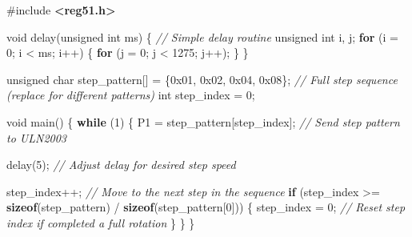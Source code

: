\documentclass[
]{article}
\newenvironment{Shaded}{}{}
\newcommand{\BaseNTok}[1]{\textcolor[rgb]{0.25,0.63,0.44}{#1}}
\newcommand{\CommentTok}[1]{\textcolor[rgb]{0.38,0.63,0.69}{\textit{#1}}}
\newcommand{\ControlFlowTok}[1]{\textcolor[rgb]{0.00,0.44,0.13}{\textbf{#1}}}
\newcommand{\DataTypeTok}[1]{\textcolor[rgb]{0.56,0.13,0.00}{#1}}
\newcommand{\DecValTok}[1]{\textcolor[rgb]{0.25,0.63,0.44}{#1}}
\newcommand{\ImportTok}[1]{\textcolor[rgb]{0.00,0.50,0.00}{\textbf{#1}}}
\newcommand{\KeywordTok}[1]{\textcolor[rgb]{0.00,0.44,0.13}{\textbf{#1}}}
\newcommand{\NormalTok}[1]{#1}
\newcommand{\OperatorTok}[1]{\textcolor[rgb]{0.40,0.40,0.40}{#1}}
\newcommand{\PreprocessorTok}[1]{\textcolor[rgb]{0.74,0.48,0.00}{#1}}
\begin{document}
\begin{Shaded}
\begin{Highlighting}[]
\PreprocessorTok{\#include }\ImportTok{\textless{}reg51.h\textgreater{}}

\DataTypeTok{void}\NormalTok{ delay}\OperatorTok{(}\DataTypeTok{unsigned} \DataTypeTok{int}\NormalTok{ ms}\OperatorTok{)} \OperatorTok{\{} \CommentTok{// Simple delay routine}
    \DataTypeTok{unsigned} \DataTypeTok{int}\NormalTok{ i}\OperatorTok{,}\NormalTok{ j}\OperatorTok{;}
    \ControlFlowTok{for} \OperatorTok{(}\NormalTok{i }\OperatorTok{=} \DecValTok{0}\OperatorTok{;}\NormalTok{ i }\OperatorTok{\textless{}}\NormalTok{ ms}\OperatorTok{;}\NormalTok{ i}\OperatorTok{++)} \OperatorTok{\{}
        \ControlFlowTok{for} \OperatorTok{(}\NormalTok{j }\OperatorTok{=} \DecValTok{0}\OperatorTok{;}\NormalTok{ j }\OperatorTok{\textless{}} \DecValTok{1275}\OperatorTok{;}\NormalTok{ j}\OperatorTok{++);}
    \OperatorTok{\}}
\OperatorTok{\}}

\DataTypeTok{unsigned} \DataTypeTok{char}\NormalTok{ step\_pattern}\OperatorTok{[]} \OperatorTok{=} \OperatorTok{\{}\BaseNTok{0x01}\OperatorTok{,} \BaseNTok{0x02}\OperatorTok{,} \BaseNTok{0x04}\OperatorTok{,} \BaseNTok{0x08}\OperatorTok{\};} \CommentTok{// Full step sequence (replace for different patterns)}
\DataTypeTok{int}\NormalTok{ step\_index }\OperatorTok{=} \DecValTok{0}\OperatorTok{;}

\DataTypeTok{void}\NormalTok{ main}\OperatorTok{()} \OperatorTok{\{}
    \ControlFlowTok{while} \OperatorTok{(}\DecValTok{1}\OperatorTok{)} \OperatorTok{\{}
\NormalTok{        P1 }\OperatorTok{=}\NormalTok{ step\_pattern}\OperatorTok{[}\NormalTok{step\_index}\OperatorTok{];} \CommentTok{// Send step pattern to ULN2003}

\NormalTok{        delay}\OperatorTok{(}\DecValTok{5}\OperatorTok{);} \CommentTok{// Adjust delay for desired step speed}

\NormalTok{        step\_index}\OperatorTok{++;} \CommentTok{// Move to the next step in the sequence}
        \ControlFlowTok{if} \OperatorTok{(}\NormalTok{step\_index }\OperatorTok{\textgreater{}=} \KeywordTok{sizeof}\OperatorTok{(}\NormalTok{step\_pattern}\OperatorTok{)} \OperatorTok{/} \KeywordTok{sizeof}\OperatorTok{(}\NormalTok{step\_pattern}\OperatorTok{[}\DecValTok{0}\OperatorTok{]))} \OperatorTok{\{}
\NormalTok{            step\_index }\OperatorTok{=} \DecValTok{0}\OperatorTok{;} \CommentTok{// Reset step index if completed a full rotation}
        \OperatorTok{\}}
    \OperatorTok{\}}
\OperatorTok{\}}
\end{Highlighting}
\end{Shaded}
\end{document}

